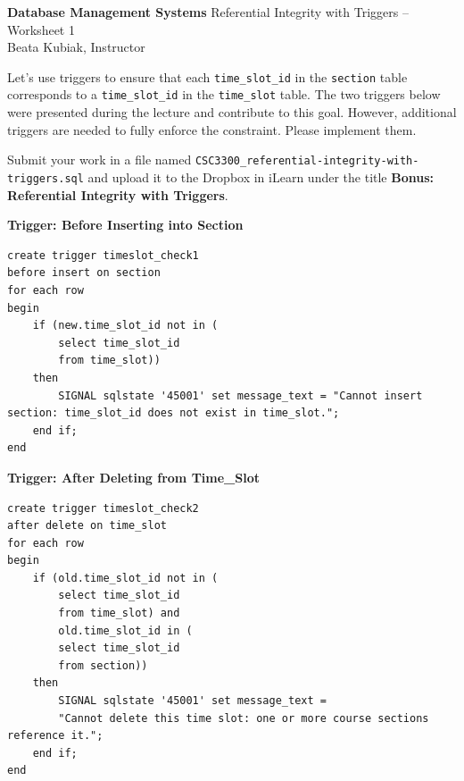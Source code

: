 \documentclass[12pt]{exam}
\begin{document}
\pagestyle{empty}

\textbf{Database Management Systems} \hfill Referential Integrity with Triggers -- Worksheet 1 \\
Beata Kubiak, Instructor

\medskip

Let's use triggers to ensure that each \texttt{time\_slot\_id} in the \texttt{section} table corresponds to a \texttt{time\_slot\_id} in the \texttt{time\_slot} table. The two triggers below were presented during the lecture and contribute to this goal. However, additional triggers are needed to fully enforce the constraint. Please implement them.

Submit your work in a file named \texttt{CSC3300\_referential-integrity-with-triggers.sql} and upload it to the Dropbox in iLearn under the title \textbf{Bonus: Referential Integrity with Triggers}.

\medskip

\textbf{Trigger: Before Inserting into Section}
\begin{tcolorbox}[colback=gray!5, colframe=black!60]
\begin{lstlisting}
create trigger timeslot_check1
before insert on section
for each row 
begin
    if (new.time_slot_id not in (
        select time_slot_id
        from time_slot))
    then
        SIGNAL sqlstate '45001' set message_text = "Cannot insert section: time_slot_id does not exist in time_slot.";
    end if;
end
\end{lstlisting}
\end{tcolorbox}

\medskip

\textbf{Trigger: After Deleting from Time\_Slot} %
\begin{tcolorbox}[colback=gray!5, colframe=black!60]
\begin{lstlisting}
create trigger timeslot_check2
after delete on time_slot
for each row 
begin
    if (old.time_slot_id not in (
        select time_slot_id
        from time_slot) and 
        old.time_slot_id in (  
        select time_slot_id
        from section))
    then
        SIGNAL sqlstate '45001' set message_text = 
        "Cannot delete this time slot: one or more course sections reference it.";
    end if;
end
\end{lstlisting}
\end{tcolorbox}
\end{document}
